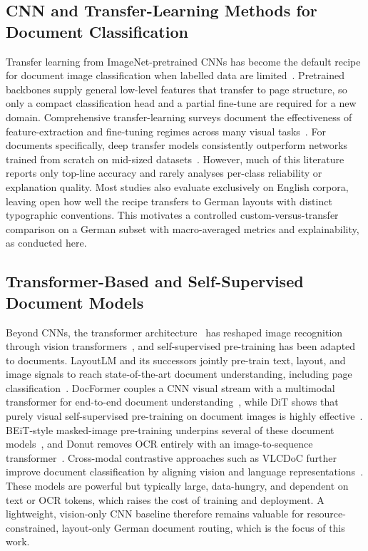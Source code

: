 \documentclass[preprint,12pt]{elsarticle}
\begin{document}
\subsection{CNN and Transfer-Learning Methods for Document Classification}
Transfer learning from ImageNet-pretrained CNNs has become the default recipe for
document image classification when labelled data are
limited~\cite{he2016deep,weiss2016survey,zhuang2021comprehensive}.
Pretrained backbones supply general low-level features that transfer to page
structure, so only a compact classification head and a partial fine-tune are
required for a new domain.
Comprehensive transfer-learning surveys document the effectiveness of
feature-extraction and fine-tuning regimes across many visual
tasks~\cite{zhuang2021comprehensive}.
For documents specifically, deep transfer models consistently outperform
networks trained from scratch on mid-sized datasets~\cite{afzal2017cutting}.
However, much of this literature reports only top-line accuracy and rarely
analyses per-class reliability or explanation quality.
Most studies also evaluate exclusively on English corpora, leaving open how well
the recipe transfers to German layouts with distinct typographic conventions.
This motivates a controlled custom-versus-transfer comparison on a German subset
with macro-averaged metrics and explainability, as conducted here.

\subsection{Transformer-Based and Self-Supervised Document Models}
Beyond CNNs, the transformer architecture~\cite{vaswani2017attention} has
reshaped image recognition through vision
transformers~\cite{dosovitskiy2021image,liu2021swin}, and self-supervised
pre-training has been adapted to documents.
LayoutLM and its successors jointly pre-train text, layout, and image signals to
reach state-of-the-art document understanding, including page
classification~\cite{xu2020layoutlm,huang2022layoutlmv3}.
DocFormer couples a CNN visual stream with a multimodal transformer for
end-to-end document understanding~\cite{appalaraju2021docformer}, while DiT shows
that purely visual self-supervised pre-training on document images is highly
effective~\cite{li2022dit}.
BEiT-style masked-image pre-training underpins several of these document
models~\cite{bao2022beit}, and Donut removes OCR entirely with an
image-to-sequence transformer~\cite{kim2022donut}.
Cross-modal contrastive approaches such as VLCDoC further improve document
classification by aligning vision and language
representations~\cite{bakkali2023vlcdoc}.
These models are powerful but typically large, data-hungry, and dependent on
text or OCR tokens, which raises the cost of training and deployment.
A lightweight, vision-only CNN baseline therefore remains valuable for
resource-constrained, layout-only German document routing, which is the focus of
this work.
\end{document}
